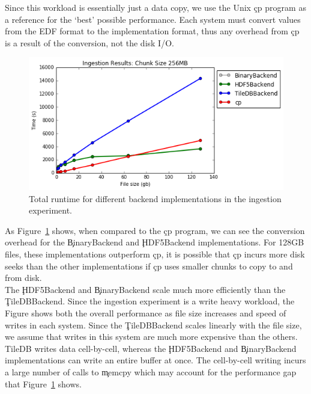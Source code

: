 Since this workload is essentially just a data copy, we use the Unix \c{cp}
program as a reference for the `best' possible performance. Each system must
convert values from the EDF format to the implementation format, thus any
overhead from \c{cp} is a result of the conversion, not the disk I/O. \\

\begin{figure}[h]
\begin{center}
\includegraphics[scale=.75]{./img/ingestion-exp.png}
\caption{Total runtime for different backend implementations in the ingestion
  experiment.}
\label{fig:ingestion-exp}
\end{center}
\end{figure}

As Figure~\ref{fig:ingestion-exp} shows, when compared to the \c{cp} program,
we can see the conversion overhead for the \c{BinaryBackend} and
\c{HDF5Backend} implementations. For 128GB files, these implementations
outperform \c{cp}, it is possible that \c{cp} incurs more disk seeks than the
other implementations if \c{cp} uses smaller chunks to copy to and from disk.
\\

The \c{HDF5Backend} and \c{BinaryBackend} scale much more efficiently than the
\c{TileDBBackend}. Since the ingestion experiment is a write heavy workload,
the Figure shows both the overall performance as file size increases and speed
of writes in each system.  Since the \c{TileDBBackend} scales linearly with the
file size, we assume that writes in this system are much more expensive than
the others. \\

TileDB writes data cell-by-cell, whereas the \c{HDF5Backend} and
\c{BinaryBackend} implementations can write an entire buffer at once. The
cell-by-cell writing incurs a large number of calls to \c{memcpy} which may
account for the performance gap that Figure~\ref{fig:ingestion-exp} shows. \\


